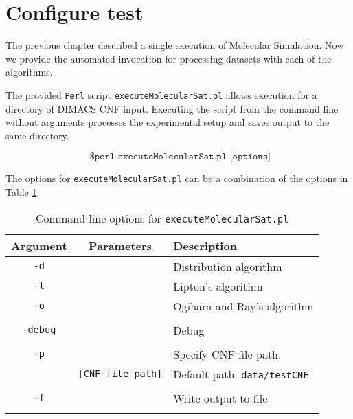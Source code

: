 	\section{Configure test}


The previous chapter described a single execution of Molecular Simulation.  Now we provide the automated invocation for processing datasets with each of the algorithms.

The provided \texttt{Perl} script \texttt{executeMolecularSat.pl} allows execution for a directory of DIMACS CNF input.  Executing the script from the command line without arguments processes the experimental setup and saves output to the same directory.

\[
\texttt{ \$ perl executeMolecularSat.pl [options]}
\]

The options for \texttt{executeMolecularSat.pl} can be a combination of the options in Table \ref{executeMolecularSatTable}.




\begin{table}[htdp]
\caption{Command line options for \texttt{executeMolecularSat.pl}}
\begin{center}
\begin{tabular}{|c|c|l|}
\hline
\textbf{Argument} & \textbf{Parameters} & \textbf{Description} \\ \hline
 \texttt{-d}	& 				   & Distribution algorithm		 \\
 \texttt{-l}	& 				   & Lipton's algorithm		 \\
 \texttt{-o}	& 				   & Ogihara and Ray's algorithm		 \\
 				&				   &		 \\ \hline 				
\texttt{-debug}		&				   & Debug		 \\ 				
 				&				   &		 \\ \hline
\texttt{-p}		&				   & Specify CNF file path. 	 \\
 				& \texttt{[CNF file path]}  &		Default path: \texttt{data/testCNF}	 \\ 			
 				&				   &		\\ \hline 	
\texttt{-f}		&				   & Write output to file		 \\
 				&				   &		\\ \hline 				
\end{tabular}
\end{center}
\label{executeMolecularSatTable}
\end{table}%

